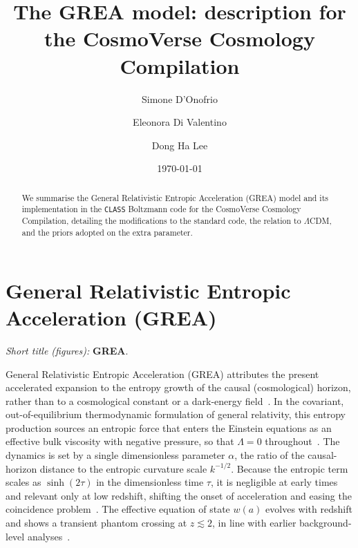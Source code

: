 \documentclass[aps,prd,reprint,superscriptaddress,nofootinbib,longbibliography]{revtex4-2}
\begin{document}
\title{The GREA model: description for the CosmoVerse Cosmology Compilation}

\author{Simone D'Onofrio}

\author{Eleonora Di Valentino}

\author{Dong Ha Lee}


\date{\today}

\begin{abstract}
We summarise the General Relativistic Entropic Acceleration (GREA) model and its
implementation in the \texttt{CLASS} Boltzmann code for the CosmoVerse Cosmology
Compilation, detailing the modifications to the standard code, the relation to
$\Lambda$CDM, and the priors adopted on the extra parameter.
\end{abstract}

\maketitle

\section{General Relativistic Entropic Acceleration (GREA)}
\label{sec:grea}
\noindent\textit{Short title (figures):} \textbf{GREA}.
\medskip

General Relativistic Entropic Acceleration (GREA) attributes the present accelerated
expansion to the entropy growth of the causal (cosmological) horizon, rather than to a
cosmological constant or a dark-energy
field~\cite{Garcia-Bellido:2021idr,Espinosa-Portales:2021cac}. In the covariant,
out-of-equilibrium thermodynamic formulation of general relativity, this entropy
production sources an entropic force that enters the Einstein equations as an effective
bulk viscosity with negative pressure, so that $\Lambda = 0$
throughout~\cite{Espinosa-Portales:2021cac,Garcia-Bellido:2024qau}. The dynamics is set by
a single dimensionless parameter $\alpha$, the ratio of the causal-horizon distance to the
entropic curvature scale $k^{-1/2}$. Because the entropic term scales as $\sinh(2\tau)$ in
the dimensionless time $\tau$, it is negligible at early times and relevant only at low
redshift, shifting the onset of acceleration and easing the coincidence
problem~\cite{Garcia-Bellido:2024qau}. The effective equation of state $w(a)$ evolves with
redshift and shows a transient phantom crossing at $z \lesssim 2$, in line with earlier
background-level analyses~\cite{Arjona:2021uxs,Calderon:2025dhj,Graziotti:2026qzl}.
\end{document}
